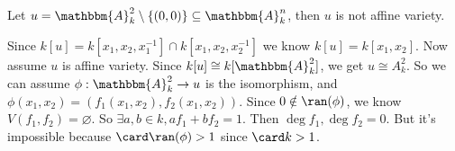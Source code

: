 \documentclass{ctexart}
\newcommand{\A}{\mathbbm{A}}
\begin{document}
\begin{problem}
Let \(u=\A_k^2 \setminus \{(0,0)\}\subseteq \A_k^n\),
then \(u\) is not affine variety.
\end{problem}
\begin{solution}
	Since \(k[u]=k[x_1,x_2,x_1^{-1}]\cap k[x_1,x_2,x_2^{-1}] \) we know \(k[u ]=k[x_1,x_2]\).
	Now assume \(u \) is affine variety.
	Since $k[u]\cong k[\A_k^2]$, we get $u\cong A_k^2$.
	So we can assume $\phi:\A_k^2\to u$ is the isomorphism, and $\phi(x_1,x_2)=(f_1(x_1,x_2),f_2(x_1,x_2))$.
	Since $0\notin \ran(\phi)$, we know $V(f_1,f_2)=\varnothing$.
	So $\exists a,b\in k,af_1+bf_2=1$. Then $\deg f_1,\deg f_2=0$.
	But it's impossible because $\card\ran(\phi)>1$ since $\card k>1$.
\end{solution}
\end{document}
